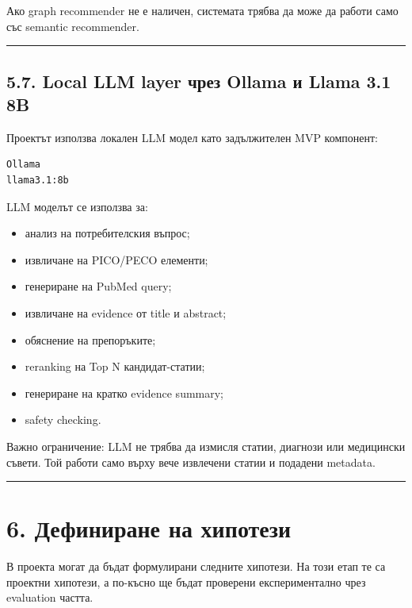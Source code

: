 \documentclass[12pt,a4paper]{article}
\providecommand{\tightlist}{\setlength{\itemsep}{0pt}\setlength{\parskip}{0pt}}
\begin{document}
Ако graph recommender не е наличен, системата трябва да може да работи само със semantic recommender.

\vspace{0.5em}\hrule\vspace{1.0em}

\subsection{5.7. Local LLM layer чрез Ollama и Llama 3.1 8B}\label{local-llm-layer-ux447ux440ux435ux437-ollama-ux438-llama-3.1-8b}

Проектът използва локален LLM модел като задължителен MVP компонент:

\begin{verbatim}
Ollama
llama3.1:8b
\end{verbatim}

LLM моделът се използва за:

\begin{itemize}
\tightlist
\item
  анализ на потребителския въпрос;
\item
  извличане на PICO/PECO елементи;
\item
  генериране на PubMed query;
\item
  извличане на evidence от title и abstract;
\item
  обяснение на препоръките;
\item
  reranking на Top N кандидат-статии;
\item
  генериране на кратко evidence summary;
\item
  safety checking.
\end{itemize}

Важно ограничение: LLM не трябва да измисля статии, диагнози или медицински съвети. Той работи само върху вече извлечени статии и подадени metadata.

\vspace{0.5em}\hrule\vspace{1.0em}

\section{6. Дефиниране на хипотези}\label{ux434ux435ux444ux438ux43dux438ux440ux430ux43dux435-ux43dux430-ux445ux438ux43fux43eux442ux435ux437ux438}

В проекта могат да бъдат формулирани следните хипотези. На този етап те са проектни хипотези, а по-късно ще бъдат проверени експериментално чрез evaluation частта.
\end{document}
